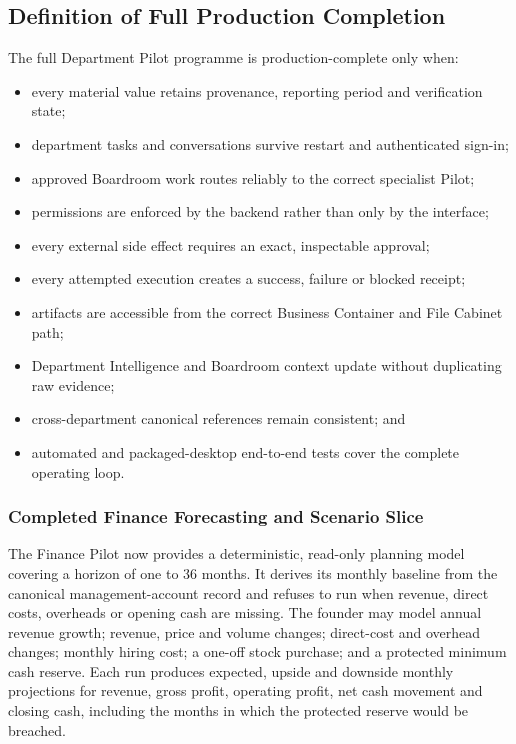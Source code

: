 \subsection{Definition of Full Production Completion}

The full Department Pilot programme is production-complete only when:

\begin{itemize}
  \item every material value retains provenance, reporting period and verification state;
  \item department tasks and conversations survive restart and authenticated sign-in;
  \item approved Boardroom work routes reliably to the correct specialist Pilot;
  \item permissions are enforced by the backend rather than only by the interface;
  \item every external side effect requires an exact, inspectable approval;
  \item every attempted execution creates a success, failure or blocked receipt;
  \item artifacts are accessible from the correct Business Container and File Cabinet path;
  \item Department Intelligence and Boardroom context update without duplicating raw evidence;
  \item cross-department canonical references remain consistent; and
  \item automated and packaged-desktop end-to-end tests cover the complete operating loop.
\end{itemize}

\subsubsection{Completed Finance Forecasting and Scenario Slice}

The Finance Pilot now provides a deterministic, read-only planning model covering a horizon
of one to 36 months. It derives its monthly baseline from the canonical management-account
record and refuses to run when revenue, direct costs, overheads or opening cash are missing.
The founder may model annual revenue growth; revenue, price and volume changes; direct-cost
and overhead changes; monthly hiring cost; a one-off stock purchase; and a protected minimum
cash reserve. Each run produces expected, upside and downside monthly projections for
revenue, gross profit, operating profit, net cash movement and closing cash, including the
months in which the protected reserve would be breached.

